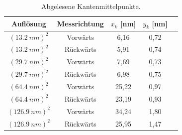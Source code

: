 \documentclass[12pt,a4paper]{article}
\begin{document}
\begin{table}
\centering
\begin{tabular}{|c|c|c|c|c|}
\hline 
Auflösung & Messrichtung & $x_k$ [nm] & $y_k$ [nm] \\ 
\hline 
$(\SI{13,2}{nm})^2$ & Vorwärts & 6,16 & 0,72 \\
\hline 
$(\SI{13,2}{nm})^2$ & Rückwärts & 5,91 & 0,74 \\
\hline 
$(\SI{29,7}{nm})^2$ & Vorwärts & 7,69 & 0,73 \\
\hline 
$(\SI{29,7}{nm})^2$ & Rückwärts & 6,98 & 0,75 \\
\hline 
$(\SI{64,4}{nm})^2$ & Vorwärts & 25,22 & 0,97 \\
\hline 
$(\SI{64,4}{nm})^2$ & Rückwärts & 23,19 & 0,93 \\
\hline 
$(\SI{126,9}{nm})^2$ & Vorwärts & 34,24 & 1,80 \\
\hline 
$(\SI{126,9}{nm})^2$ & Rückwärts & 25,95 & 1,47 \\
\hline 
\end{tabular} 
\caption{Abgelesene Kantenmittelpunkte.}
\label{tab:Kantenmittelpunkte_Ergebnisse}
\end{table}
\end{document}
